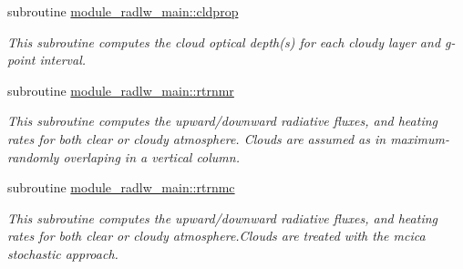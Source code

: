 {\bf }\par
\begin{DoxyCompactItemize}
\item 
subroutine \hyperlink{group__module__radlw__main_ga735598d1b11b0a090d142977a8f64f89}{module\+\_\+radlw\+\_\+main\+::cldprop}
\begin{DoxyCompactList}\small\item\em This subroutine computes the cloud optical depth(s) for each cloudy layer and g-\/point interval. \end{DoxyCompactList}\end{DoxyCompactItemize}

{\bf }\par
\begin{DoxyCompactItemize}
\item 
subroutine \hyperlink{group__module__radlw__main_gab0d2454aa5b29643b52fa31abe2f97b0}{module\+\_\+radlw\+\_\+main\+::rtrnmr}
\begin{DoxyCompactList}\small\item\em This subroutine computes the upward/downward radiative fluxes, and heating rates for both clear or cloudy atmosphere. Clouds are assumed as in maximum-\/randomly overlaping in a vertical column. \end{DoxyCompactList}\end{DoxyCompactItemize}

{\bf }\par
\begin{DoxyCompactItemize}
\item 
subroutine \hyperlink{group__module__radlw__main_gaf0e13eadc5dad88e144734d2c6b9fd0f}{module\+\_\+radlw\+\_\+main\+::rtrnmc}
\begin{DoxyCompactList}\small\item\em This subroutine computes the upward/downward radiative fluxes, and heating rates for both clear or cloudy atmosphere.\+Clouds are treated with the mcica stochastic approach. \end{DoxyCompactList}\end{DoxyCompactItemize}

